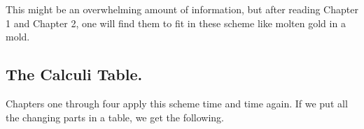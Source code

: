This might be an overwhelming amount of information, but after reading Chapter 1 and Chapter 2, one will find them to fit in these scheme like molten gold in a mold.

\subsection{The Calculi Table.}

Chapters one through four apply this scheme time and time again. If we put all the changing parts in a table, we get the following.

\bgroup
\begin{table}[H]
\centering
\captionsetup{labelformat=empty}
\caption{(Table 1) The Calculi Table.}
\def\arraystretch{2}

\end{table}
